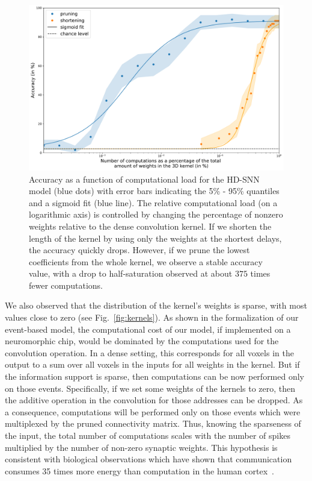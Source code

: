 \documentclass[default]{sn-jnl}%
\theoremstyle{thmstyleone}%
\theoremstyle{thmstyletwo}%
\theoremstyle{thmstylethree}%
\newcommand{\seeFig}[1]{see Fig.~\ref{fig:#1}}%
\begin{document}
\begin{figure}%
    \centering
    \includegraphics[width=0.95\linewidth]{figures/quant_accuracy.pdf}
    \caption{
        Accuracy as a function of computational load for the HD-SNN model (blue dots) with error bars indicating the 5\% - 95\% quantiles and a sigmoid fit (blue line). The relative computational load (on a logarithmic axis) is controlled by changing the percentage of nonzero weights relative to the dense convolution kernel. If we shorten the length of the kernel by using only the weights at the shortest delays, the accuracy quickly drops. However, if we prune the lowest coefficients from the whole kernel, we observe a stable accuracy value, with a drop to half-saturation observed at about $375$ times fewer computations.
        }
    \label{fig:accuracy}
\end{figure}
%
We also observed that the distribution of the kernel's weights is sparse, with most values close to zero (\seeFig{kernels}). As shown in the formalization of our event-based model, the computational cost of our model, if implemented on a neuromorphic chip, would be dominated by the computations used for the convolution operation. In a dense setting, this corresponds for all voxels in the output to a sum over all voxels in the inputs for all weights in the kernel. But if the information support is sparse, then computations can be now performed only on those events. Specifically, if we set some weights of the kernels to zero, then the additive operation in the convolution for those addresses can be dropped. As a consequence, computations will be performed only on those events which were multiplexed by the pruned connectivity matrix. Thus, knowing the sparseness of the input, the total number of computations scales with the number of spikes multiplied by the number of non-zero synaptic weights. This hypothesis is consistent with biological observations which have shown that communication consumes 35 times more energy than computation in the human cortex~\citep{Levy2021}.
\end{document}
